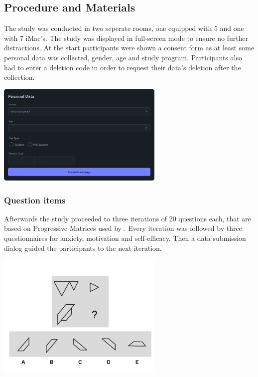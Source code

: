 \subsection{Procedure and Materials}
The study was conducted in two seperate rooms, one equipped with 5 and one with 7 iMac's. The study was displayed in full-screen mode to ensure no further distractions.
At the start participants were shown a consent form as at least some personal data was collected, gender, age and study program. Participants also had to enter a deletion code in order to request their data's deletion after the collection.
\begin{minipage}{\textwidth}
    \includegraphics[width=0.6\textwidth]{img/details.png}
    \label{fig:figureDetails}
  \end{minipage}
\subsubsection{Question items}
Afterwards the study proceeded to three iterations of 20 questions each, that are based on Progressive Matrices used by \Textcite{albuquerqueDoesGenderStereotype2017}.
Every iteration was followed by three questionnaires for anxiety, motivation and self-efficacy. Then a data submission dialog guided the participants to the next iteration.
\begin{minipage}{\textwidth}
    \includegraphics[width=0.6\textwidth]{img/q-17.png}
    \label{fig:figureMatrix}
  \end{minipage}
  

